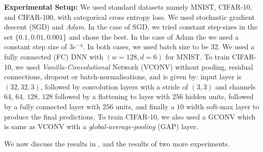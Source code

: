 \textbf{Experimental Setup:} We used standard datasets namely MNIST, CIFAR-10, and CIFAR-100, with categorical cross entropy loss. We used stochastic gradient descent (SGD) and \emph{Adam}. In the case of SGD, we tried constant step-sizes in the set $\{0.1,0.01,0.001\}$ and chose the best. In the case of Adam the we used a constant step size of $3e^{-4}$. In both cases, we used batch size to be $32$. We used a fully connected (FC) DNN with $(w=128,d=6)$ for MNIST.%
To train CIFAR-10, we used \emph{Vanilla-Convolutional} Network (VCONV) without pooling, residual connections, dropout or batch-normalisations, and is given by: input layer is $(32, 32, 3)$, followed by convolution layers with a stride of $(3, 3)$ and channels $64$, $64$, $128$, $128$ followed by a flattening to layer with $256$ hidden units, followed by a fully connected layer with $256$ units, and finally a  $10$ width soft-max layer to produce the final predictions. To train CIFAR-10, we also used a GCONV which is same as VCONV with a \emph{global-average-pooling} (GAP) layer.

 We now discuss the results in , and the results of two more experiments.
 \begin{table}[!t]
\caption{Shows the training and generalisation performance of various NPFs.}
\label{tb:npfs}
\end{table}

